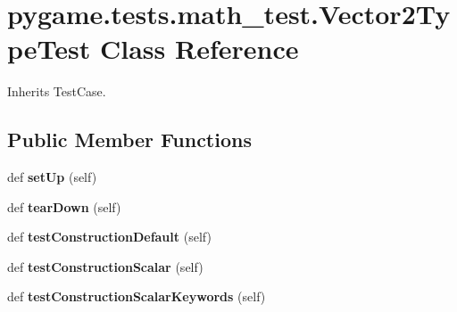 \hypertarget{classpygame_1_1tests_1_1math__test_1_1_vector2_type_test}{}\section{pygame.\+tests.\+math\+\_\+test.\+Vector2\+Type\+Test Class Reference}
\label{classpygame_1_1tests_1_1math__test_1_1_vector2_type_test}


Inherits Test\+Case.

\subsection*{Public Member Functions}
\begin{DoxyCompactItemize}
\item 
\mbox{\label{classpygame_1_1tests_1_1math__test_1_1_vector2_type_test_ac9a5ea1b7e70e83507f4139c9b963bf6}} 
def {\bfseries set\+Up} (self)
\item 
\mbox{\label{classpygame_1_1tests_1_1math__test_1_1_vector2_type_test_a84edfc60cdff5e47ef4231011d551e86}} 
def {\bfseries tear\+Down} (self)
\item 
\mbox{\label{classpygame_1_1tests_1_1math__test_1_1_vector2_type_test_af9bb433bb29da2cb0bf7d33487fbfbcc}} 
def {\bfseries test\+Construction\+Default} (self)
\item 
\mbox{\label{classpygame_1_1tests_1_1math__test_1_1_vector2_type_test_a01903f52cea414dc092b318a9628e3f6}} 
def {\bfseries test\+Construction\+Scalar} (self)
\item 
\mbox{\label{classpygame_1_1tests_1_1math__test_1_1_vector2_type_test_a80fa25752c46cbfbf9a396fbbca8d3cf}} 
def {\bfseries test\+Construction\+Scalar\+Keywords} (self)
\item 
\mbox{\label{classpygame_1_1tests_1_1math__test_1_1_vector2_type_test_acef1ddb9477c433bb15611158d27d6b2}} 

\end{DoxyCompactItemize}

